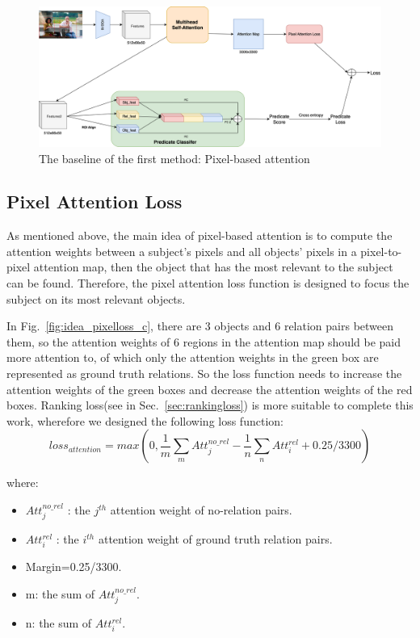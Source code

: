 \begin{figure}[H]
	\centering
	\includegraphics[width=1\linewidth]{figures/method1_baseline}
	\caption[The baseline of the first method: Pixel-based attention]{The baseline of the  first method: Pixel-based attention}
	\label{fig:method1baseline}
\end{figure}

\subsection{Pixel  Attention Loss}
\label{sec:pixelattentionloss}
As mentioned above, the main idea of pixel-based attention is to compute the attention weights between a subject's pixels and all objects' pixels in a pixel-to-pixel attention map, then the object that has the most relevant to the subject can be found. Therefore, the pixel attention loss function is designed to focus the subject on its most relevant objects.

In Fig.~\ref{fig:idea_pixelloss_c}, there are 3 objects and 6 relation pairs between them, so the attention weights of 6 regions in the attention map should be paid more attention to, of which only the attention weights in the green box are represented as ground truth relations. So the loss function needs to increase the attention weights of the green boxes and decrease the attention weights of the red boxes. Ranking loss(see in Sec.~\ref{sec:rankingloss}) is more suitable to complete this work, wherefore we designed the following loss function:
\begin{equation}\label{pixel_attention_loss}
	loss_{attention}=max(0, \frac{1}{m}\sum_{m}Att_j^{no\_rel}-\frac{1}{n}\sum_{n}Att_i^{rel}+0.25
	/3300)
\end{equation}

where:
\begin{itemize}
	\item $ Att_j^{no\_rel} $ : the $ j^{th} $ attention weight of no-relation pairs.
	\item $ Att_i^{rel} $ :  the $ i^{th} $ attention weight of ground truth relation pairs.
	\item Margin=0.25/3300.
	\item m: the sum of $ Att_j^{no\_rel}$.
	\item n: the sum of $ Att_i^{rel} $.
\end{itemize}


